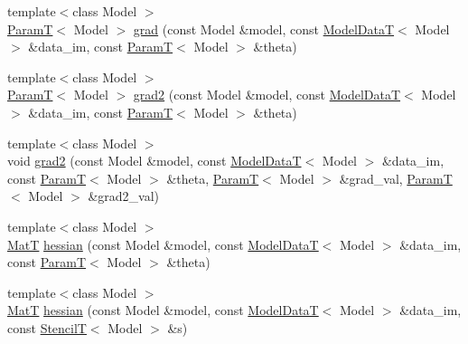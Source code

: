 \begin{DoxyCompactItemize}
\item 
{\footnotesize template$<$class Model $>$ }\\\hyperlink{namespacemappel_a667925cb0d6c0e49f2f035cc5a9a6857}{ParamT}$<$ Model $>$ \hyperlink{namespacemappel_1_1methods_1_1objective_a7adc23453a6c075227b8bd4d3e7a494b}{grad} (const Model \&model, const \hyperlink{namespacemappel_a97f050df953605381ae9c901c3b125f1}{Model\+DataT}$<$ Model $>$ \&data\+\_\+im, const \hyperlink{namespacemappel_a667925cb0d6c0e49f2f035cc5a9a6857}{ParamT}$<$ Model $>$ \&theta)
\item 
{\footnotesize template$<$class Model $>$ }\\\hyperlink{namespacemappel_a667925cb0d6c0e49f2f035cc5a9a6857}{ParamT}$<$ Model $>$ \hyperlink{namespacemappel_1_1methods_1_1objective_a5a6ea0d3fa967fa2ade437fceb717af6}{grad2} (const Model \&model, const \hyperlink{namespacemappel_a97f050df953605381ae9c901c3b125f1}{Model\+DataT}$<$ Model $>$ \&data\+\_\+im, const \hyperlink{namespacemappel_a667925cb0d6c0e49f2f035cc5a9a6857}{ParamT}$<$ Model $>$ \&theta)
\item 
{\footnotesize template$<$class Model $>$ }\\void \hyperlink{namespacemappel_1_1methods_1_1objective_ab437033475ac0491ae1dd3a2900a5c44}{grad2} (const Model \&model, const \hyperlink{namespacemappel_a97f050df953605381ae9c901c3b125f1}{Model\+DataT}$<$ Model $>$ \&data\+\_\+im, const \hyperlink{namespacemappel_a667925cb0d6c0e49f2f035cc5a9a6857}{ParamT}$<$ Model $>$ \&theta, \hyperlink{namespacemappel_a667925cb0d6c0e49f2f035cc5a9a6857}{ParamT}$<$ Model $>$ \&grad\+\_\+val, \hyperlink{namespacemappel_a667925cb0d6c0e49f2f035cc5a9a6857}{ParamT}$<$ Model $>$ \&grad2\+\_\+val)
\item 
{\footnotesize template$<$class Model $>$ }\\\hyperlink{namespacemappel_a7091ab87c528041f7e2027195fad8915}{MatT} \hyperlink{namespacemappel_1_1methods_1_1objective_aff0530b529e752a4c9039a8aef0eac20}{hessian} (const Model \&model, const \hyperlink{namespacemappel_a97f050df953605381ae9c901c3b125f1}{Model\+DataT}$<$ Model $>$ \&data\+\_\+im, const \hyperlink{namespacemappel_a667925cb0d6c0e49f2f035cc5a9a6857}{ParamT}$<$ Model $>$ \&theta)
\item 
{\footnotesize template$<$class Model $>$ }\\\hyperlink{namespacemappel_a7091ab87c528041f7e2027195fad8915}{MatT} \hyperlink{namespacemappel_1_1methods_1_1objective_a21e579dfc19a06952bf98bd9d684fbdc}{hessian} (const Model \&model, const \hyperlink{namespacemappel_a97f050df953605381ae9c901c3b125f1}{Model\+DataT}$<$ Model $>$ \&data\+\_\+im, const \hyperlink{namespacemappel_a3a06598240007876f8c4bf834ad86197}{StencilT}$<$ Model $>$ \&s)

\end{DoxyCompactItemize}
